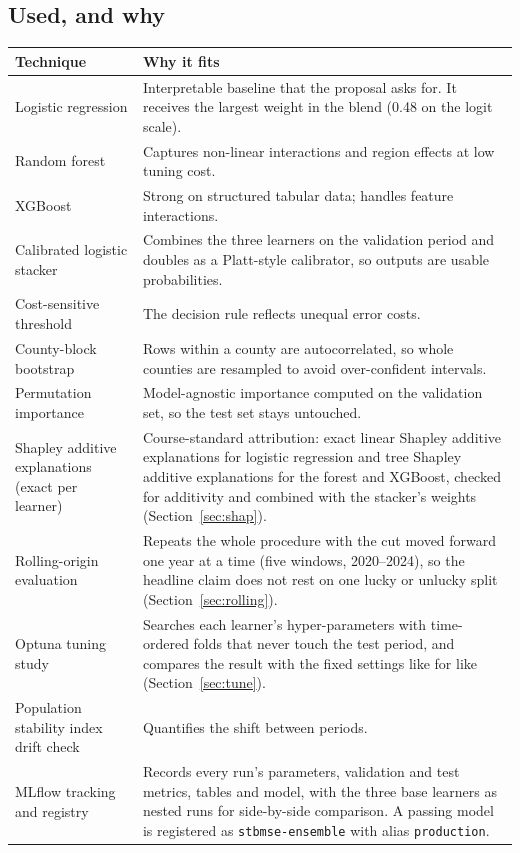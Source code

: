 \documentclass[11pt,a4paper]{article}
\newcommand{\code}[1]{\texttt{#1}}
\begin{document}
\subsection*{Used, and why}
\begin{longtable}{@{}>{\raggedright\arraybackslash}p{3.7cm}>{\raggedright\arraybackslash}p{11.9cm}@{}}
\toprule
\textbf{Technique} & \textbf{Why it fits} \\
\midrule
\endhead
Logistic regression & Interpretable baseline that the proposal asks for. It receives the largest weight in the blend (0.48 on the logit scale). \\
Random forest~\cite{breiman2001} & Captures non-linear interactions and region effects at low tuning cost. \\
XGBoost~\cite{chen2016} & Strong on structured tabular data; handles feature interactions. \\
Calibrated logistic stacker~\cite{wolpert1992,platt1999} & Combines the three learners on the validation period and doubles as a Platt-style calibrator, so outputs are usable probabilities. \\
Cost-sensitive threshold & The decision rule reflects unequal error costs. \\
County-block bootstrap & Rows within a county are autocorrelated, so whole counties are resampled to avoid over-confident intervals. \\
Permutation importance & Model-agnostic importance computed on the validation set, so the test set stays untouched. \\
Shapley additive explanations (exact per learner) & Course-standard attribution: exact linear Shapley additive explanations for logistic regression and tree Shapley additive explanations for the forest and XGBoost, checked for additivity and combined with the stacker's weights (Section~\ref{sec:shap}). \\
Rolling-origin evaluation & Repeats the whole procedure with the cut moved forward one year at a time (five windows, 2020--2024), so the headline claim does not rest on one lucky or unlucky split (Section~\ref{sec:rolling}). \\
Optuna tuning study & Searches each learner's hyper-parameters with time-ordered folds that never touch the test period, and compares the result with the fixed settings like for like (Section~\ref{sec:tune}). \\
Population stability index drift check & Quantifies the shift between periods. \\
MLflow tracking and registry & Records every run's parameters, validation and test metrics, tables and model, with the three base learners as nested runs for side-by-side comparison. A passing model is registered as \code{stbmse-ensemble} with alias \code{production}. \\

\end{longtable}
\end{document}
